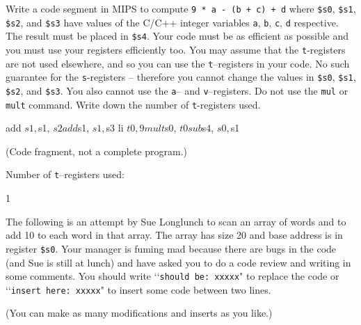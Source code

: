 Write a code segment in MIPS to compute
\verb!9 * a - (b + c) + d! where
\verb!$s0!, \verb!$s1!, \verb!$s2!, and
\verb!$s3! have values of the C/C++ integer variables
\verb!a!, \verb!b!, \verb!c!, \verb!d! respective.
The result must be placed in \verb!$s4!.
Your code must be as efficient as possible
and you must use your registers efficiently too.
You may assume that the \verb!t!-registers
are not used elsewhere, and so you
can use the \verb!t!--registers in your code.
No such guarantee for the \verb!s!-registers -- therefore
you cannot change the values in
\verb!$s0!, \verb!$s1!, \verb!$s2!, and \verb!$s3!.
You also cannot use the \verb!a!-- and \verb!v!--registers.
Do not use the \verb!mul! or \verb!mult! command.
Write down the number of \verb!t!-registers used.
\\
\ANSWER
\begin{answercode}
add     $s1, $s1, $s2
add     $s1, $s1, $s3
li      $t0, 9
mult    $s0, $t0
sub     $s4, $s0, $s1
\end{answercode}
\vspace{-4mm}
(Code fragment, not a complete program.)

Number of \verb!t!--registers used:
\\
\ANSWER
\begin{answercode}
1
\end{answercode}


\newpage
\nextq
The following is an attempt by Sue Longlunch to scan an array of 
words and to add 10 to each word in that array. 
The array has size 20 and base address is in register 
\verb!$s0!.
Your manager is fuming mad because there are bugs in the code
(and Sue is still at lunch) and have asked you to
do a code review and 
writing in some comments.
You should write \lq\lq \verb!should be: xxxxx!" to replace
the code or
\lq\lq\verb!insert here: xxxxx!" to insert some code between two lines.

(You can make as many modifications and inserts as you like.)


